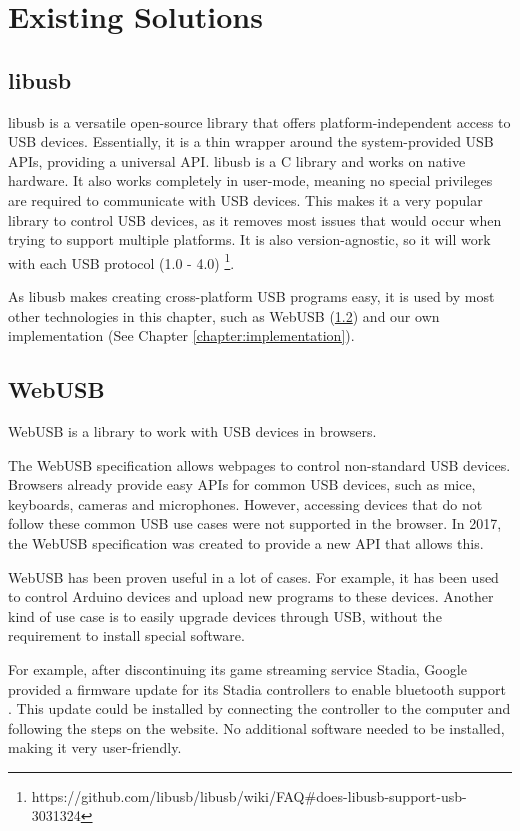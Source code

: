 \section{Existing Solutions}

\subsection{libusb}
\label{section:libusb}
libusb \cite{LibUSB} is a versatile open-source library that offers platform-independent access to USB devices. Essentially, it is a thin wrapper around the system-provided USB APIs, providing a universal API. libusb is a C library and works on native hardware. It also works completely in user-mode, meaning no special privileges are required to communicate with USB devices. This makes it a very popular library to control USB devices, as it removes most issues that would occur when trying to support multiple platforms. It is also version-agnostic, so it will work with each USB protocol (1.0 - 4.0) \footnote{https://github.com/libusb/libusb/wiki/FAQ\#does-libusb-support-usb-3031324}.

As libusb makes creating cross-platform USB programs easy, it is used by most other technologies in this chapter, such as WebUSB (\ref{section:WebUSB}) and our own implementation (See Chapter \ref{chapter:implementation}).

\subsection{WebUSB}
\label{section:WebUSB}

WebUSB \cite{WebUSB} is a library to work with USB devices in browsers.

The WebUSB specification allows webpages to control non-standard USB devices. Browsers already provide easy APIs for common USB devices, such as mice, keyboards, cameras and microphones. However, accessing devices that do not follow these common USB use cases were not supported in the browser. In 2017, the WebUSB specification was created to provide a new API that allows this.

WebUSB has been proven useful in a lot of cases. For example, it has been used to control Arduino devices and upload new programs to these devices. Another kind of use case is to easily upgrade devices through USB, without the requirement to install special software. 

For example, after discontinuing its game streaming service Stadia, Google provided a firmware update for its Stadia controllers to enable bluetooth support \cite{stadia_bluetooth_mode} \cite{stadia_bluetooth_mode_explanation}. This update could be installed by connecting the controller to the computer and following the steps on the website. No additional software needed to be installed, making it very user-friendly.

